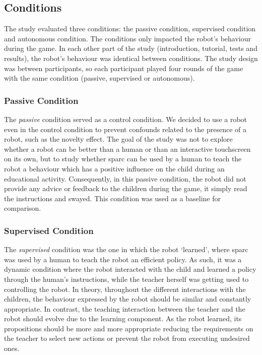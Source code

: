 \subsection{Conditions}

The study evaluated three conditions: the passive condition, supervised condition and autonomous condition. The conditions only impacted the robot's behaviour during the game. In each other part of the study (introduction, tutorial, tests and results), the robot's behaviour was identical between conditions.
The study design was between participants, so each participant played four rounds of the game with the same condition (passive, supervised or autonomous).  

\subsubsection{Passive Condition}

The \textit{passive} condition served as a control condition. We decided to use a robot even in the control condition to prevent confounds related to the presence of a robot, such as the novelty effect. The goal of the study was not to explore whether a robot can be better than a human or than an interactive touchscreen on its own, but to study whether \gls{sparc} can be used by a human to teach the robot a behaviour which has a positive influence on the child during an educational activity. Consequently, in this passive condition, the robot did not provide any advice or feedback to the children during the game, it simply read the instructions and swayed. This condition was used as a baseline for comparison.

\subsubsection{Supervised Condition}

The \textit{supervised} condition was the one in which the robot `learned', where \gls{sparc} was used by a human to teach the robot an efficient policy. As such, it was a dynamic condition where the robot interacted with the child and learned a policy through the human's instructions, while the teacher herself was getting used to controlling the robot. In theory, throughout the different interactions with the children, the behaviour expressed by the robot should be similar and constantly appropriate. In contrast, the teaching interaction between the teacher and the robot should evolve due to the learning component. As the robot learned, its propositions should be more and more appropriate reducing the requirements on the teacher to select new actions or prevent the  robot from executing undesired ones.

